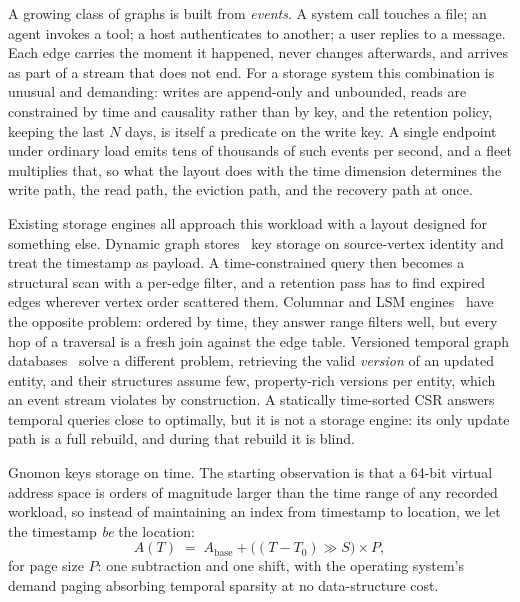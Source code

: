 \documentclass[letterpaper,twocolumn,10pt]{article}
\newcommand{\sys}{Gnomon\xspace}
\begin{document}
A growing class of graphs is built from \emph{events}. A system call
touches a file; an agent invokes a tool; a host authenticates to
another; a user replies to a message. Each edge carries the moment it
happened, never changes afterwards, and arrives as part of a stream
that does not end. For a storage system this combination is unusual
and demanding: writes are append-only and unbounded, reads are
constrained by time and causality rather than by key, and the
retention policy, keeping the last $N$ days, is itself a predicate on
the write key. A single endpoint under ordinary load emits tens of
thousands of such events per second, and a fleet multiplies that, so
what the layout does with the time dimension determines the write
path, the read path, the eviction path, and the recovery path at once.

Existing storage engines all approach this workload with a layout
designed for something else. Dynamic graph
stores~\cite{wheatman2021ppcsr, shen2026dcsr, dhulipala2019aspen,
fuchs2023sortledton, pandey2021terrace, deleo2021teseo, zhu2020livegraph,
kumar2019graphone} key storage on source-vertex identity and treat the
timestamp as payload. A time-constrained query then becomes a
structural scan with a per-edge filter, and a retention pass has to
find expired edges wherever vertex order scattered them. Columnar and
LSM engines~\cite{raasveldt2019duckdb} have the opposite problem:
ordered by time, they answer range filters well, but every hop of a
traversal is a fresh join against the edge table. Versioned temporal
graph databases~\cite{li2026tva, hou2024aeong} solve a different
problem, retrieving the valid \emph{version} of an updated entity, and
their structures assume few, property-rich versions per
entity, which an event stream violates by construction. A statically
time-sorted CSR answers temporal queries close to optimally, but it is
not a storage engine: its only update path is a full rebuild, and
during that rebuild it is blind.

\sys keys storage on time. The starting observation is that a 64-bit
virtual address space is orders of magnitude larger than the time
range of any recorded workload, so instead of maintaining an index
from timestamp to location, we let the timestamp \emph{be} the
location:
\begin{equation}
A(T) \;=\; A_{\mathrm{base}} + \big((T - T_{0}) \gg S\big)\times P,
\label{eq:mapping}
\end{equation}
for page size $P$: one subtraction and one shift, with the operating
system's demand paging absorbing temporal sparsity at no
data-structure cost.
\end{document}
